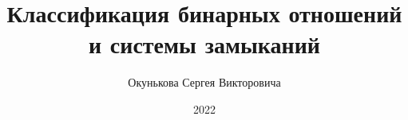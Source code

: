 \documentclass[spec, och, labwork]{shiza}
\begin{document}
\chair{}

\title{Классификация бинарных отношений и системы замыканий}






\author{Окунькова Сергея Викторовича}








\date{2022}

\maketitle

\end{document}
